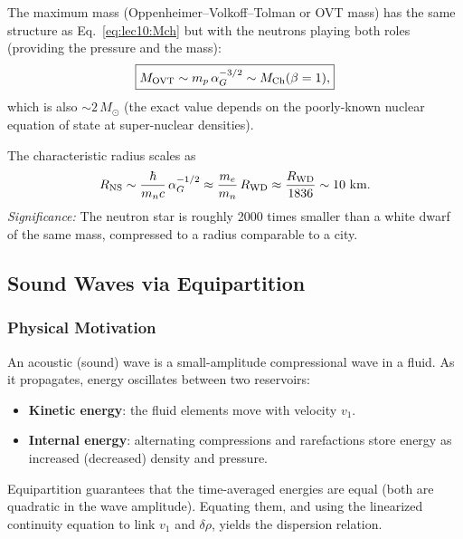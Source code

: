 The maximum mass (Oppenheimer--Volkoff--Tolman or OVT mass) has the same
structure as Eq.~\eqref{eq:lec10:Mch} but with the neutrons playing both roles
(providing the pressure and the mass):
\begin{equation}
    \boxed{
    M_{\rm OVT} \sim m_p\,\alpha_G^{-3/2} \sim M_{\rm Ch}(\beta=1),
    }
    \label{eq:lec10:Movt}
\end{equation}
which is also $\sim 2\,M_\odot$ (the exact value depends on the poorly-known
nuclear equation of state at super-nuclear densities).

The characteristic radius scales as
\begin{equation}
    R_{\rm NS} \sim \frac{\hbar}{m_n c}\,\alpha_G^{-1/2}
    \approx \frac{m_e}{m_n}\,R_{\rm WD}
    \approx \frac{R_{\rm WD}}{1836}
    \sim \text{10 km}.
    \label{eq:lec10:Rns}
\end{equation}
\textit{Significance:} The neutron star is roughly 2000 times smaller than a white
dwarf of the same mass, compressed to a radius comparable to a city.


\subsection{Sound Waves via Equipartition}
\label{sec:lec10:sound}

\subsubsection*{Physical Motivation}
An acoustic (sound) wave is a small-amplitude compressional wave in a fluid. As
it propagates, energy oscillates between two reservoirs:
\begin{itemize}
    \item \textbf{Kinetic energy}: the fluid elements move with velocity $v_1$.
    \item \textbf{Internal energy}: alternating compressions and rarefactions
    store energy as increased (decreased) density and pressure.
\end{itemize}
Equipartition guarantees that the time-averaged energies are equal (both are
quadratic in the wave amplitude). Equating them, and using the linearized
continuity equation to link $v_1$ and $\delta\rho$, yields the dispersion
relation.


